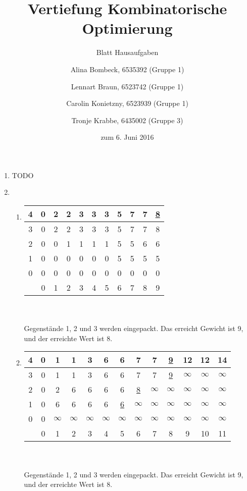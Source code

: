 \documentclass[a4paper]{scrartcl}
\title{Vertiefung Kombinatorische Optimierung}
\subtitle{Blatt {\blattnr} Hausaufgaben}
\author{%
    Alina Bombeck, 6535392 (Gruppe 1) \and
    Lennart Braun, 6523742 (Gruppe 1) \and
    Carolin Konietzny, 6523939 (Gruppe 1) \and
    Tronje Krabbe, 6435002 (Gruppe 3)
}
\date{zum 6. Juni 2016}
\begin{document}
\maketitle


\begin{enumerate}[label=\bfseries \arabic*.]
\item %
    TODO

\item %
\begin{enumerate}
    \item %
        \begin{tabular}[t]{c||c|c|c|c|c|c|c|c|c|c|}
            4 & 0 & 2 & 2 & 3 & 3 & 3 & 5 & 7 & 7 & \underline{8} \\ \hline
            3 & 0 & 2 & 2 & 3 & 3 & 3 & 5 & 7 & 7 & 8 \\ \hline
            2 & 0 & 0 & 1 & 1 & 1 & 1 & 5 & 5 & 6 & 6 \\ \hline
            1 & 0 & 0 & 0 & 0 & 0 & 0 & 5 & 5 & 5 & 5 \\ \hline
            0 & 0 & 0 & 0 & 0 & 0 & 0 & 0 & 0 & 0 & 0 \\ \hhline{=#=|=|=|=|=|=|=|=|=|=|}
              & 0 & 1 & 2 & 3 & 4 & 5 & 6 & 7 & 8 & 9\\
        \end{tabular}
        \\ \\
        Gegenstände 1, 2 und 3 werden eingepackt. Das erreicht Gewicht ist 9,
        und der erreichte Wert ist 8.

    \item %
        \begin{tabular}[t]{c||c|c|c|c|c|c|c|c|c|c|c|c|}
            4 & 0 & 1 & 1 & 3 & 6 & 6 & 7 & 7 & \underline{9} & 12 & 12 & 14 \\ \hline
            3 & 0 & 1 & 1 & 3 & 6 & 6 & 7 & 7 & \underline{9} & $\infty$ & $\infty$ & $\infty$ \\ \hline
            2 & 0 & 2 & 6 & 6 & 6 & 6 & \underline{8} & $\infty$ & $\infty$ & $\infty$ & $\infty$ & $\infty$ \\ \hline
            1 & 0 & 6 & 6 & 6 & 6 & \underline{6} & $\infty$ & $\infty$ & $\infty$ & $\infty$ & $\infty$ & $\infty$ \\ \hline
            0 & 0 & $\infty$ & $\infty$ & $\infty$ & $\infty$ & $\infty$ & $\infty$ & $\infty$ & $\infty$ & $\infty$ & $\infty$ & $\infty$ \\ \hhline{=#=|=|=|=|=|=|=|=|=|=|=|=|}
              & 0 & 1 & 2 & 3 & 4 & 5 & 6 & 7 & 8 & 9 & 10 & 11 \\
        \end{tabular}
        \\ \\
        Gegenstände 1, 2 und 3 werden eingepackt. Das erreicht Gewicht ist 9,
        und der erreichte Wert ist 8.

\end{enumerate}
\end{enumerate}
\end{document}
